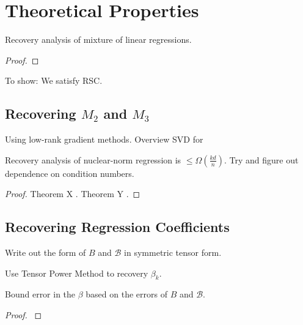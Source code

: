 \section{Theoretical Properties}
\label{sec:theory}

\begin{theorem}
  Recovery analysis of mixture of linear regressions.
\end{theorem}
\begin{proof}
\end{proof}

To show: We satisfy RSC. 


\subsection{Recovering $M_2$ and $M_3$}

Using low-rank gradient methods. Overview SVD for 

\begin{lemma}
  Recovery analysis of nuclear-norm regression is $\le
  \Omega(\frac{kd}{n})$. Try and figure out dependence on condition
  numbers.
\end{lemma}
\begin{proof}
  Theorem X \cite{NegahbanWainwright2009}.
  Theorem Y \cite{Tomioka2011}.
\end{proof}

\subsection{Recovering Regression Coefficients}

Write out the form of $B$ and $\mathcal{B}$ in symmetric tensor form.

Use Tensor Power Method to recovery $\beta_k$.

\begin{lemma}
  Bound error in the $\beta$ based on the errors of $B$ and $\mathcal{B}$.
\end{lemma}
\begin{proof}
  \cite{AnandkumarGeHsu2012}
\end{proof}

